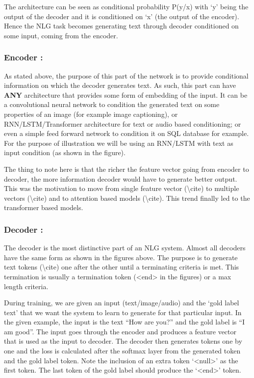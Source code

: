 \documentclass[]{krantz}
\begin{document}
The architecture can be seen as conditional probability P(y/x) with `y' being the output of the decoder and it is conditioned on `x' (the output of the encoder). Hence the NLG task becomes generating text through decoder conditioned on some input, coming from the encoder.

\hypertarget{encoder}{%
\subsubsection{Encoder :}\label{encoder}}

As stated above, the purpose of this part of the network is to provide conditional information on which the decoder generates text. As such, this part can have \textbf{ANY} architecture that provides some form of embedding of the input. It can be a convolutional neural network to condition the generated text on some properties of an image (for example image captioning), or RNN/LSTM/Transformer architecture for text or audio based conditioning; or even a simple feed forward network to condition it on SQL database for example. For the purpose of illustration we will be using an RNN/LSTM with text as input condition (as shown in the figure).

The thing to note here is that the richer the feature vector going from encoder to decoder, the more information decoder would have to generate better output. This was the motivation to move from single feature vector (\textbackslash{}cite) to multiple vectors (\textbackslash{}cite) and to attention based models (\textbackslash{}cite). This trend finally led to the transformer based models.

\hypertarget{decoder}{%
\subsubsection{Decoder :}\label{decoder}}

The decoder is the most distinctive part of an NLG system. Almost all decoders have the same form as shown in the figures above. The purpose is to generate text tokens (\textbackslash{}cite) one after the other until a terminating criteria is met. This termination is usually a termination token (\textless{}end\textgreater{} in the figures) or a max length criteria.

During training, we are given an input (text/image/audio) and the `gold label text' that we want the system to learn to generate for that particular input. In the given example, the input is the text ``How are you?'' and the gold label is ``I am good''. The input goes through the encoder and produces a feature vector that is used as the input to decoder. The decoder then generates tokens one by one and the loss is calculated after the softmax layer from the generated token and the gold label token. Note the inclusion of an extra token `\textless{}null\textgreater{}' as the first token. The last token of the gold label should produce the `\textless{}end\textgreater{}' token.
\end{document}
